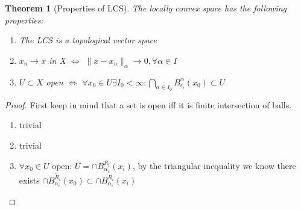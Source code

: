 \documentclass[a4paper,11pt,fleqn]{book}
\newtheorem{theorem}{Theorem}[section]
\theoremstyle{definition}
\theoremstyle{remark}
\begin{document}
\begin{theorem}[Properties of LCS]
	The locally convex space has the following properties:
	\begin{enumerate}
		\item The LCS is a topological vector space
		\item $x_n \rightarrow x$ in X $\Leftrightarrow$ $\|x - x_n\|_\alpha \rightarrow 0,  \forall \alpha \in I$
		\item  $U \subset X$ open $\Leftrightarrow$ $\forall x_0 \in U \exists  I_0 < \infty: \bigcap_{\alpha \in  I_0} B_{\epsilon_i}^\alpha(x_0) \subset U$
	\end{enumerate}
\end{theorem}
\begin{proof}
First keep in mind that a set is open iff it is finite intersection of balls.
\begin{enumerate}
	\item trivial
	\item trivial
	\item $\forall x_0 \in U$ open: $U = \cap B_{\alpha_i}^{R_i}(x_i)$, by the triangular inequality we know there exists $\cap B_{\alpha_i}^{\tilde{R}_i}(x_0) \subset \cap B_{\alpha_i}^{R_i}(x_i)$
\end{enumerate}
\end{proof}
\end{document}
